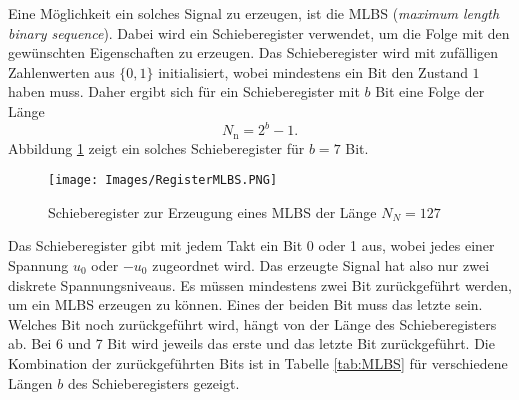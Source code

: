 \documentclass[12pt,report,final,twoside,accentcolor=tud9b,bigchapter]{tudreport}
\begin{document}
Eine Möglichkeit ein solches Signal zu erzeugen, ist die MLBS
(\textit{maximum length binary sequence}). Dabei wird ein
Schieberegister verwendet, um die Folge mit den gewünschten
Eigenschaften zu erzeugen. Das Schieberegister wird mit zufälligen Zahlenwerten aus $\{0,1\}$ initialisiert, wobei mindestens ein Bit den Zustand $1$ haben muss. Daher ergibt sich für ein Schieberegister mit $b$ Bit eine Folge der Länge 
\begin{equation}
N_\mathrm{n} = 2^b-1.
\end{equation}
Abbildung \ref{fig:RegMLBS} zeigt ein solches Schieberegister für $b=7$ Bit.
\begin{figure}[h!]
  \centering
      \texttt{[image: Images/RegisterMLBS.PNG]}
      \caption{Schieberegister zur Erzeugung eines MLBS der Länge
$N_N=127$ \citep{skript}}
      \label{fig:RegMLBS}
\end{figure}
Das Schieberegister gibt mit jedem Takt ein Bit 0 oder 1 aus, wobei jedes einer Spannung $u_0$ oder $-u_0$ zugeordnet wird. Das erzeugte Signal hat also nur zwei diskrete Spannungsniveaus. 
Es müssen mindestens zwei Bit zurückgeführt werden, um ein MLBS erzeugen
zu können. Eines der beiden Bit muss das letzte sein. Welches Bit noch
zurückgeführt wird, hängt von der Länge des Schieberegisters ab. Bei 6
und 7 Bit wird jeweils das erste und das letzte Bit zurückgeführt. Die Kombination der
zurückgeführten Bits ist in Tabelle \ref{tab:MLBS} für verschiedene
Längen $b$ des Schieberegisters gezeigt.
\end{document}
